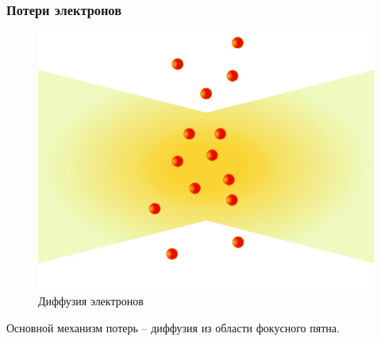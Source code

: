\documentclass{beamer}
\begin{document}
	\begin{frame}
		\frametitle{Потери электронов}
		
		\begin{figure}
			\centering
			\includegraphics[width=0.5\linewidth]{res/diffusion.png}
			\caption*{Диффузия электронов}
		\end{figure}
		
		Основной механизм потерь -- диффузия из области фокусного пятна.
				
	\end{frame}
\end{document}
